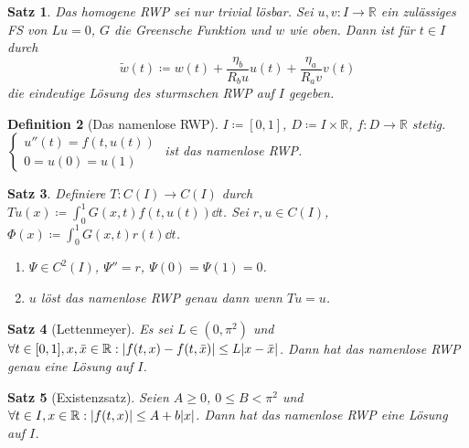 \documentclass[a4paper]{article}
\newcounter{Sec}
\theoremstyle{marginbreak}
\newtheorem{definition}{Definition}[Sec]
\newtheorem{satz}[definition]{Satz}
\newcommand{\R}{\mathbb{R}}
\begin{document}
	\begin{satz}
		Das homogene RWP sei nur trivial lösbar. Sei $u, v\colon I\to\R$ ein zulässiges FS
		von $Lu=0$, $G$ die Greensche Funktion und $w$ wie oben. Dann ist für $t\in I$ durch
		\[
			\tilde{w}(t)\coloneqq w(t)+\frac{\eta_b}{R_bu}u(t)+\frac{\eta_a}{R_av}v(t)
		\]
		die eindeutige Lösung des sturmschen RWP auf $I$ gegeben.
	\end{satz}
	\begin{definition}[Das namenlose RWP]
		$I\coloneqq [0, 1]$, $D\coloneqq I\times\R$, $f\colon D\to\R$ stetig.
		$\begin{cases}u''(t)=f(t,u(t))\\0=u(0)=u(1)\end{cases}$ ist das namenlose RWP.
	\end{definition}
	\begin{satz}
		Definiere $T\colon C(I)\to C(I)$ durch $Tu(x)\coloneqq\int_0^1G(x, t)f(t, u(t))\dd{t}$.
		Sei $r, u\in C(I)$, $\Phi(x)\coloneqq\int_0^1G(x, t)r(t)\dd{t}$.
		\begin{enumerate}[label=(\alph*)]
			\item $\Psi\in C^2(I)$, $\Psi''=r$, $\Psi(0)=\Psi(1)=0$.
			\item $u$ löst das namenlose RWP genau dann wenn $Tu=u$.
		\end{enumerate}
	\end{satz}
	\begin{satz}[Lettenmeyer]
		Es sei $L\in(0,\pi^2)$ und $\forall t\in[0,1], x, \bar{x}\in\R:\abs{f(t, x)-f(t,\bar{x})}\leq L\abs{x-\bar{x}}$.
		Dann hat das namenlose RWP genau eine Lösung auf $I$.
	\end{satz}
	\begin{satz}[Existenzsatz]
		Seien $A\geq 0$, $0\leq B<\pi^2$ und $\forall t\in I, x\in\R:\abs{f(t, x)}\leq A+b\abs{x}$. Dann
		hat das namenlose RWP eine Lösung auf $I$.
	\end{satz}
\end{document}
